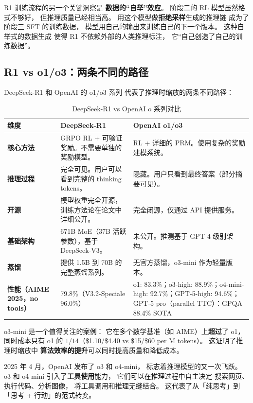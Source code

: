 R1 训练流程的另一个关键洞察是
\textbf{数据的“自举”效应}。
阶段二的 RL 模型虽然格式不够好，
但推理质量已经相当高。
用这个模型做\textbf{拒绝采样}生成的推理链
成为了阶段三 SFT 的训练数据，
模型用自己的输出来训练自己的下一个版本。
这种自举式的数据生成
使得 R1 不依赖外部的人类推理标注，
它“自己创造了自己的训练数据”。

\subsection{R1 vs o1/o3：两条不同的路径}

DeepSeek-R1 和 OpenAI 的 o1/o3 系列
代表了推理时缩放的两条不同路径：

\begin{table}[H]
\centering\small
\renewcommand{\arraystretch}{1.3}
\caption{DeepSeek-R1 vs OpenAI o 系列对比}\label{tab:r1-vs-o1}
\begin{tabularx}{\linewidth}{l X X}
\toprule
\rowcolor{figLightGray}
\textbf{维度} & \textbf{DeepSeek-R1} & \textbf{OpenAI o1/o3} \\
\midrule
\textbf{核心方法} & GRPO RL + 可验证奖励。不需要单独的奖励模型。 & RL + 详细的 PRM。使用复杂的奖励建模系统。 \\
\textbf{推理过程} & 完全可见。用户可以看到完整的 thinking tokens。 & 隐藏。用户只看到最终答案（部分摘要可见）。 \\
\textbf{开源} & 模型权重完全开源，训练方法论在论文中详细公开。 & 完全闭源，仅通过 API 提供服务。 \\
\textbf{基础架构} & 671B MoE（37B 活跃参数），基于 DeepSeek-V3。 & 未公开。推测基于 GPT-4 级别架构。 \\
\textbf{蒸馏} & 提供 1.5B 到 70B 的完整蒸馏系列。 & 无官方蒸馏，o3-mini 作为轻量版本。 \\
\textbf{性能（AIME 2025，no tools）} & 79.8\%（V3.2-Speciale 96.0\%） & o1: 83.3\%；o3-high: 88.9\%；o4-mini-high: 92.7\%；GPT-5-high: 94.6\%；GPT-5 pro（parallel TTC）：GPQA 88.4\% SOTA \\
\bottomrule
\end{tabularx}
\end{table}

o3-mini 是一个值得关注的案例：
它在多个数学基准（如 AIME）上\textbf{超过}了 o1，
同时成本只有 o1 的 $1/14$（\$1.10/\$4.40 vs \$15/\$60 per M tokens）。
这证明了推理时缩放中
\textbf{算法效率的提升}可以同时提高质量和降低成本。

2025 年 4 月，OpenAI 发布了 o3 和 o4-mini，
标志着推理模型的又一次飞跃。
o3 和 o4-mini 引入了\textbf{工具使用}能力，
它们可以在推理过程中自主决定
搜索网页、执行代码、分析图像，
将工具调用和推理无缝结合。
这代表了从「纯思考」到「思考 + 行动」的范式转变。

